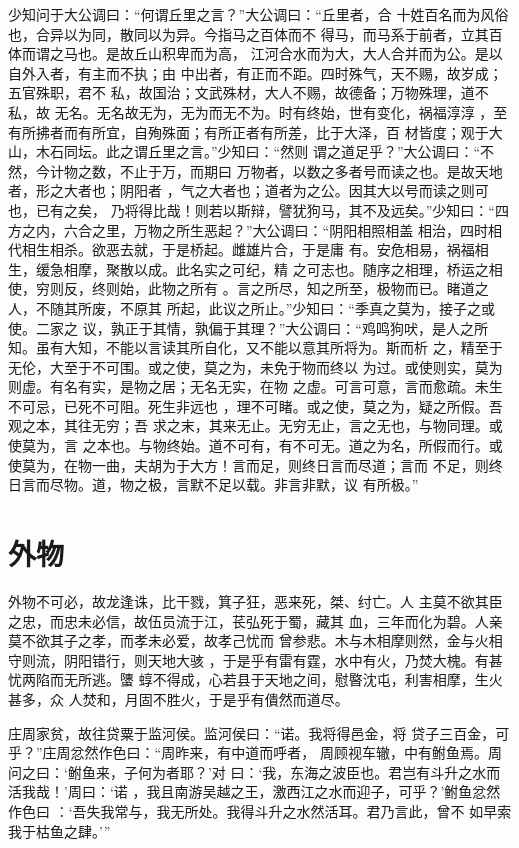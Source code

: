 \documentclass[12pt,UTF8]{ctexbook}
\begin{document}
少知问于大公调曰：“何谓丘里之言？”大公调曰：“丘里者，合 十姓百名而为风俗也，合异以为同，散同以为异。今指马之百体而不 得马，而马系于前者，立其百体而谓之马也。是故丘山积卑而为高， 江河合水而为大，大人合并而为公。是以自外入者，有主而不执；由 中出者，有正而不距。四时殊气，天不赐，故岁成；五官殊职，君不 私，故国治；文武殊材，大人不赐，故德备；万物殊理，道不私，故 无名。无名故无为，无为而无不为。时有终始，世有变化，祸福淳淳 ，至有所拂者而有所宜，自殉殊面；有所正者有所差，比于大泽，百 材皆度；观于大山，木石同坛。此之谓丘里之言。”少知曰：“然则 谓之道足乎？”大公调曰：“不然，今计物之数，不止于万，而期曰 万物者，以数之多者号而读之也。是故天地者，形之大者也；阴阳者 ，气之大者也；道者为之公。因其大以号而读之则可也，已有之矣， 乃将得比哉！则若以斯辩，譬犹狗马，其不及远矣。”少知曰：“四 方之内，六合之里，万物之所生恶起？”大公调曰：“阴阳相照相盖 相治，四时相代相生相杀。欲恶去就，于是桥起。雌雄片合，于是庸 有。安危相易，祸福相生，缓急相摩，聚散以成。此名实之可纪，精 之可志也。随序之相理，桥运之相使，穷则反，终则始，此物之所有 。言之所尽，知之所至，极物而已。睹道之人，不随其所废，不原其 所起，此议之所止。”少知曰：“季真之莫为，接子之或使。二家之 议，孰正于其情，孰偏于其理？”大公调曰：“鸡鸣狗吠，是人之所 知。虽有大知，不能以言读其所自化，又不能以意其所将为。斯而析 之，精至于无伦，大至于不可围。或之使，莫之为，未免于物而终以 为过。或使则实，莫为则虚。有名有实，是物之居；无名无实，在物 之虚。可言可意，言而愈疏。未生不可忌，已死不可阻。死生非远也 ，理不可睹。或之使，莫之为，疑之所假。吾观之本，其往无穷；吾 求之末，其来无止。无穷无止，言之无也，与物同理。或使莫为，言 之本也。与物终始。道不可有，有不可无。道之为名，所假而行。或 使莫为，在物一曲，夫胡为于大方！言而足，则终日言而尽道；言而 不足，则终日言而尽物。道，物之极，言默不足以载。非言非默，议 有所极。”
\section{外物}

外物不可必，故龙逢诛，比干戮，箕子狂，恶来死，桀、纣亡。人 主莫不欲其臣之忠，而忠未必信，故伍员流于江，苌弘死于蜀，藏其 血，三年而化为碧。人亲莫不欲其子之孝，而孝未必爱，故孝己忧而 曾参悲。木与木相摩则然，金与火相守则流，阴阳错行，则天地大骇 ，于是乎有雷有霆，水中有火，乃焚大槐。有甚忧两陷而无所逃。螴 蜳不得成，心若县于天地之间，慰暋沈屯，利害相摩，生火甚多，众 人焚和，月固不胜火，于是乎有僓然而道尽。

庄周家贫，故往贷粟于监河侯。监河侯曰：“诺。我将得邑金，将 贷子三百金，可乎？”庄周忿然作色曰：“周昨来，有中道而呼者， 周顾视车辙，中有鲋鱼焉。周问之曰：‘鲋鱼来，子何为者耶？’对 曰：‘我，东海之波臣也。君岂有斗升之水而活我哉！’周曰：‘诺 ，我且南游吴越之王，激西江之水而迎子，可乎？’鲋鱼忿然作色曰 ：‘吾失我常与，我无所处。我得斗升之水然活耳。君乃言此，曾不 如早索我于枯鱼之肆。’”
\end{document}
